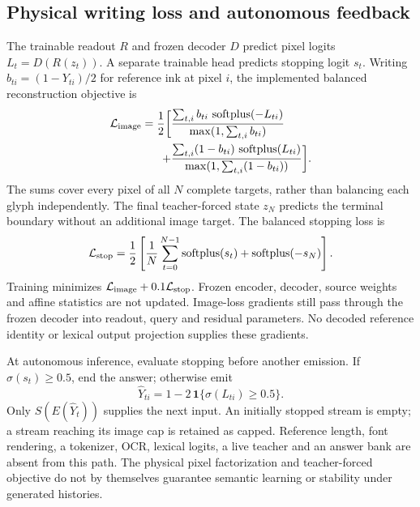 \subsection*{Physical writing loss and autonomous feedback}
The trainable readout $R$ and frozen decoder $D$ predict pixel logits
$L_t=D(R(z_t))$. A separate trainable head predicts stopping logit $s_t$.
Writing $b_{ti}=(1-Y_{ti})/2$ for reference ink at pixel $i$, the implemented
balanced reconstruction objective is
\begin{equation}
 \begin{split}
 \mathcal L_{\rm image}=\frac12\biggl[
 &\frac{\sum_{t,i}b_{ti}\,\operatorname{softplus}(-L_{ti})}
 {\max(1,\sum_{t,i}b_{ti})}\\
 +&\frac{\sum_{t,i}(1-b_{ti})\,\operatorname{softplus}(L_{ti})}
 {\max(1,\sum_{t,i}(1-b_{ti}))}\biggr].
 \end{split}
 \label{eq:continuation-image-loss}
\end{equation}
The sums cover every pixel of all $N$ complete targets, rather than balancing
each glyph independently. The final teacher-forced state $z_N$ predicts the
terminal boundary without an additional image target. The balanced stopping loss is
\begin{equation}
 \mathcal L_{\rm stop}=\frac12\left[
 \frac1N\sum_{t=0}^{N-1}\operatorname{softplus}(s_t)
 +\operatorname{softplus}(-s_N)\right].
 \label{eq:continuation-stop-loss}
\end{equation}
Training minimizes $\mathcal L_{\rm image}+0.1\mathcal L_{\rm stop}$.
Frozen encoder, decoder, source weights and affine statistics are not updated.
Image-loss gradients still pass through the frozen decoder into readout,
query and residual parameters. No decoded reference identity or lexical output
projection supplies these gradients.

At autonomous inference, evaluate stopping before another emission. If
$\sigma(s_t)\geq0.5$, end the answer; otherwise emit
\begin{equation}
 \widehat Y_{ti}=1-2\,\mathbf1\{\sigma(L_{ti})\geq0.5\}.
 \label{eq:continuation-emission}
\end{equation}
Only $S(E(\widehat Y_t))$ supplies the next input. An initially stopped stream
is empty; a stream reaching its image cap is retained as capped. Reference
length, font rendering, a tokenizer, OCR, lexical logits, a live teacher and an
answer bank are absent from this path. The physical pixel factorization and
teacher-forced objective do not by themselves guarantee semantic learning or
stability under generated histories.

